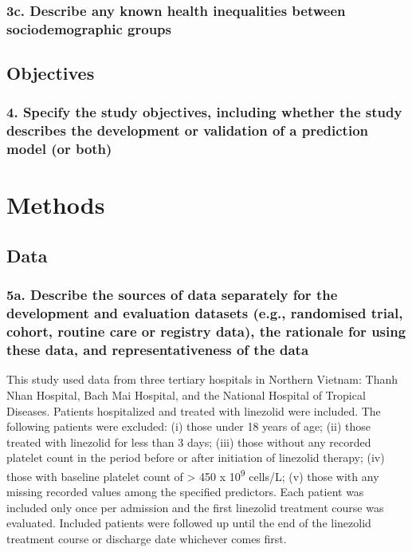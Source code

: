 \documentclass[
  letterpaper,
  DIV=11,
  numbers=noendperiod]{scrartcl}
\begin{document}
\subsubsection{3c. Describe any known health inequalities between
sociodemographic
groups}\label{c.-describe-any-known-health-inequalities-between-sociodemographic-groups}

\subsection{Objectives}\label{objectives}

\subsubsection{4. Specify the study objectives, including whether the
study describes the development or validation of a prediction model (or
both)}\label{specify-the-study-objectives-including-whether-the-study-describes-the-development-or-validation-of-a-prediction-model-or-both}

\section{Methods}\label{methods}

\subsection{Data}\label{data}

\subsubsection{5a. Describe the sources of data separately for the
development and evaluation datasets (e.g., randomised trial, cohort,
routine care or registry data), the rationale for using these data, and
representativeness of the
data}\label{a.-describe-the-sources-of-data-separately-for-the-development-and-evaluation-datasets-e.g.-randomised-trial-cohort-routine-care-or-registry-data-the-rationale-for-using-these-data-and-representativeness-of-the-data}

This study used data from three tertiary hospitals in Northern Vietnam:
Thanh Nhan Hospital, Bach Mai Hospital, and the National Hospital of
Tropical Diseases. Patients hospitalized and treated with linezolid were
included. The following patients were excluded: (i) those under 18 years
of age; (ii) those treated with linezolid for less than 3 days; (iii)
those without any recorded platelet count in the period before or after
initiation of linezolid therapy; (iv) those with baseline platelet count
of \textgreater{} 450 x 10\textsuperscript{9} cells/L; (v) those with
any missing recorded values among the specified predictors. Each patient
was included only once per admission and the first linezolid treatment
course was evaluated. Included patients were followed up until the end
of the linezolid treatment course or discharge date whichever comes
first.
\end{document}

